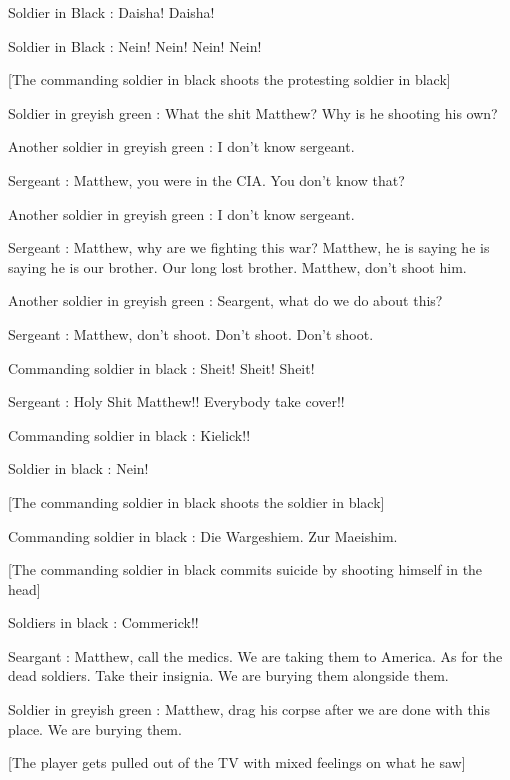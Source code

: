 \documentclass[a4paper,12pt]{report}
\begin{document}
Soldier in Black : Daisha! Daisha!\newline

Soldier in Black :  Nein! Nein! Nein! Nein!\newline

[The commanding soldier in black shoots the protesting soldier in black]\newline

Soldier in greyish green : What the shit Matthew? Why is he shooting his own?\newline

Another soldier in greyish green : I don't know sergeant.\newline

Sergeant : Matthew, you were in the CIA. You don't know that?\newline

Another soldier in greyish green : I don't know sergeant.\newline

Sergeant : Matthew, why are we fighting this war? Matthew, he is saying he is saying he is our brother. Our long lost brother. Matthew, don't shoot him.\newline

Another soldier in greyish green : Seargent, what do we do about this?\newline

Sergeant : Matthew, don't shoot. Don't shoot. Don't shoot.\newline

Commanding soldier in black : Sheit! Sheit! Sheit!\newline

Sergeant : Holy Shit Matthew!! Everybody take cover!!\newline

Commanding soldier in black : Kielick!! \newline

Soldier in black : Nein!\newline

[The commanding soldier in black shoots the soldier in black]\newline

Commanding soldier in black : Die Wargeshiem. Zur Maeishim.\newline

[The commanding soldier in black commits suicide by shooting himself in the head]\newline

Soldiers in black : Commerick!!\newline

Seargant : Matthew, call the medics. We are taking them to America. As for the dead soldiers. Take their insignia. We are burying them alongside them.\newline

Soldier in greyish green : Matthew, drag his corpse after we are done with this place. We are burying them.\newline

[The player gets pulled out of the TV with mixed feelings on what he saw]\newline
\end{document}
